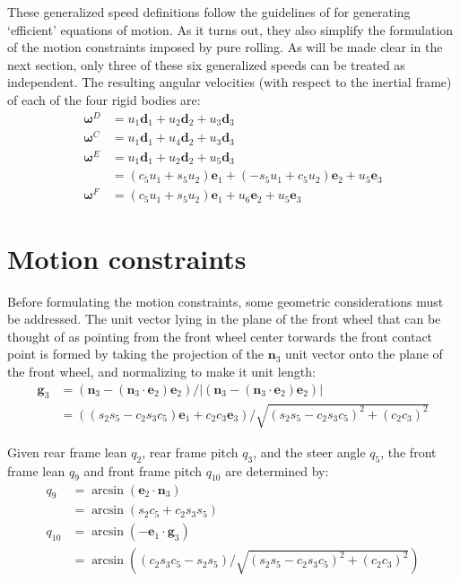 \documentclass[letterpaper,11pt]{article}
\newcommand{\bs}[1]{ \boldsymbol{ #1 } }
\begin{document}
These generalized speed definitions follow the guidelines of \cite{Mitiguy1996}
for generating `efficient' equations of motion.  As it turns out, they also
simplify the formulation of the motion constraints imposed by pure rolling.  As
will be made clear in the next section, only three of these six generalized
speeds can be treated as independent.  The resulting angular velocities (with
respect to the inertial frame) of each of the four rigid bodies are:
\begin{align*}
  \bs{\omega}^D & = u_1 \bs{d}_1 + u_2 \bs{d}_2 + u_3 \bs{d}_3 \\
  \bs{\omega}^C & = u_1 \bs{d}_1 + u_4 \bs{d}_2 + u_3 \bs{d}_3 \\
  \bs{\omega}^E & = u_1 \bs{d}_1 + u_2 \bs{d}_2 + u_5 \bs{d}_3 \\
                & = (c_5 u_1 + s_5 u_2)\bs{e}_1 + (-s_5 u_1 + c_5 u_2) \bs{e}_2
                    + u_5 \bs{e}_3 \\
  \bs{\omega}^F & = (c_5 u_1 + s_5 u_2)\bs{e}_1 + u_6 \bs{e}_2
                    + u_5 \bs{e}_3
\end{align*}

\section*{Motion constraints}

Before formulating the motion constraints, some geometric considerations
must be addressed.  The unit vector lying in the plane of the front wheel that
can be thought of as pointing from the front wheel center torwards the front
contact point is formed by taking the projection of the $\bs{n}_3$ unit vector
onto the plane of the front wheel, and normalizing to make it unit length:
\begin{align*}
  \bs{g}_3 & = (\bs{n}_3 - (\bs{n}_3 \cdot \bs{e}_2) \bs{e}_2) / |(\bs{n}_3 -
  (\bs{n}_3 \cdot \bs{e}_2) \bs{e}_2)| \\
  & = ((s_2 s_5 - c_2 s_3 c_5) \bs{e}_1 + c_2 c_3 \bs{e}_3) / \sqrt{(s_2 s_5 -
  c_2 s_3 c_5)^2 + (c_2 c_3)^2}
\end{align*}

Given rear frame lean $q_2$, rear frame pitch $q_3$, and the steer angle
$q_5$, the front frame lean $q_9$ and front frame pitch $q_{10}$ are determined by:
\begin{align*}
    q_9 & = \arcsin(\bs{e}_2 \cdot \bs{n}_3) \\
    & = \arcsin(s_2 c_5 + c_2 s_3 s_5) \\
    q_{10} & = \arcsin(-\bs{e}_1 \cdot \bs{g}_3) \\
           & = \arcsin((c_2 s_3 c_5 - s_2 s_5) / \sqrt{(s_2 s_5 -
                c_2 s_3 c_5)^2 + (c_2 c_3)^2})
\end{align*}
\end{document}
